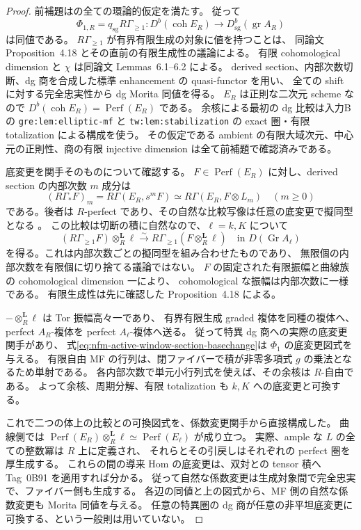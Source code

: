 \begin{proof}
前補題は\cite[Theorem~6.4(3)]{NFMBurkeStevenson}の全ての環論的仮定を満たす。
従って
\[
 \Phi_{1,R}=q_{\mathrm{sg}}R\Gamma_{\ge1}:
 D^b(\operatorname{coh}E_R)\longrightarrow D^b_{\mathrm{sg}}(\operatorname{gr}A_R)
\]
は同値である。
$R\Gamma_{\ge1}$ が有界有限生成の対象に値を持つことは、
同論文 Proposition~4.18 とその直前の有限生成性の議論による。
有限 cohomological dimension と $\chi$ は同論文 Lemmas~6.1--6.2 による。
derived section、内部次数切断、dg 商を合成した標準 enhancement の quasi-functor を用い、
全ての shift に対する完全忠実性から dg Morita 同値を得る。
$E_R$ は正則な二次元 scheme なので $D^b(\operatorname{coh}E_R)=\operatorname{Perf}(E_R)$ である。
余核による最初の dg 比較は入力Bの
\texttt{gre:lem:elliptic-mf} と \texttt{tw:lem:stabilization} の
exact 圏・有限 totalization による構成を使う。
その仮定である ambient の有限大域次元、中心元の正則性、商の有限 injective dimension は全て前補題で確認済みである。

底変更を関手そのものについて確認する。
$F\in\operatorname{Perf}(E_R)$ に対し、derived section の内部次数 $m$ 成分は
\[
 (R\Gamma_*F)_m=R\Gamma(E_R,s^mF)
   \simeq R\Gamma(E_R,F\otimes L_m)\quad(m\ge0)
\]
である。後者は $R$-perfect であり、その自然な比較写像は任意の底変更で擬同型となる
\cite[Lemma~36.30.4, Tag~0B91]{NFMStacksPerfectBasechange}。
この比較は切断の積に自然なので、$\ell=k,K$ について
\begin{equation}\label{eq:nfm-active-window-section-basechange}
 (R\Gamma_{\ge1}F)\otimes_R^{\mathbf L}\ell
 \xrightarrow{\sim}
 R\Gamma_{\ge1}(F\otimes_R^{\mathbf L}\ell)
 \quad\text{in }D(\operatorname{Gr}A_\ell)
\end{equation}
を得る。これは内部次数ごとの擬同型を組み合わせたものであり、
無限個の内部次数を有限個に切り捨てる議論ではない。
$F$ の固定された有限振幅と曲線族の cohomological dimension 一により、
cohomological な振幅は内部次数に一様である。
有限生成性は先に確認した Proposition~4.18 による。

$-\otimes_R^{\mathbf L}\ell$ は Tor 振幅高々一であり、
有界有限生成 graded 複体を同種の複体へ、perfect $A_R$-複体を perfect $A_\ell$-複体へ送る。
従って特異 dg 商への実際の底変更関手があり、
式\eqref{eq:nfm-active-window-section-basechange}は $\Phi_1$ の底変更図式を与える。
有限自由 MF の行列は、閉ファイバーで積が非零多項式 $g$ の乗法となるため単射である。
各内部次数で単元小行列式を使えば、その余核は $R$-自由である。
よって余核、周期分解、有限 totalization も $k,K$ への底変更と可換する。

これで二つの体上の比較との可換図式を、係数変更関手から直接構成した。
曲線側では $\operatorname{Perf}(E_R)\otimes_R^{\mathbf L}\ell
\simeq\operatorname{Perf}(E_\ell)$ が成り立つ。
実際、ample な $L$ の全ての整数冪は $R$ 上に定義され、
それらとその引戻しはそれぞれの perfect 圏を厚生成する。
これらの間の導来 Hom の底変更は、双対との tensor 積へ
Tag~0B91 を適用すれば分かる。
従って自然な係数変更は生成対象間で完全忠実で、ファイバー側も生成する。
各辺の同値と上の図式から、MF 側の自然な係数変更も Morita 同値を与える。
任意の特異圏の dg 商が任意の非平坦底変更に可換する、という一般則は用いていない。


\end{proof}
